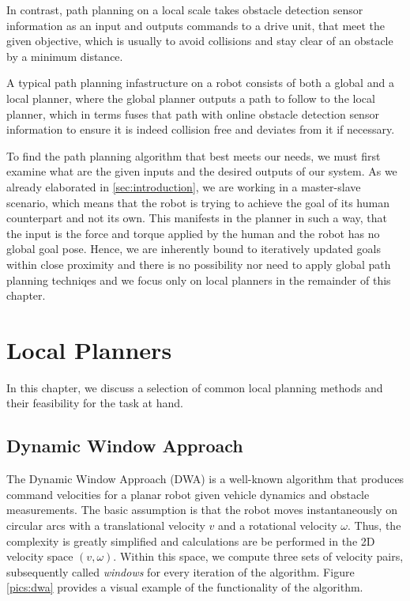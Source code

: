 In contrast, path planning on a local scale takes obstacle detection sensor information as an input and outputs commands to a drive unit, that meet the given objective, which is usually to avoid collisions and stay clear of an obstacle by a minimum distance. 

A typical path planning infastructure on a robot consists of both a global and a local planner, where the global planner outputs a path to follow to the local planner, which in terms fuses that path with online obstacle detection sensor information to ensure it is indeed collision free and deviates from it if necessary.

To find the path planning algorithm that best meets our needs, we must first examine what are the given inputs and the desired outputs of our system. As we already elaborated in \cref{sec:introduction}, we are working in a master-slave scenario, which means that the robot is trying to achieve the goal of its human counterpart and not its own. This manifests in the planner in such a way, that the input is the force and torque applied by the human and the robot has no global goal pose. Hence, we are inherently bound to iteratively updated goals within close proximity and there is no possibility nor need to apply global path planning techniqes and we focus only on local planners in the remainder of this chapter.

\section{Local Planners}
In this chapter, we discuss a selection of common local planning methods and their feasibility for the task at hand.


\subsection{Dynamic Window Approach}
The Dynamic Window Approach (DWA) \citep{fox1997dynamic} is a well-known algorithm that produces command velocities for a planar robot given vehicle dynamics and obstacle measurements. The basic assumption is that the robot moves instantaneously on circular arcs with a translational velocity $v$ and a rotational velocity $\omega$. Thus, the complexity is greatly simplified and calculations are be performed in the 2D velocity space $(v,\omega)$. Within this space, we compute three sets of velocity pairs,  subsequently called \emph{windows} for every iteration of the algorithm. Figure \ref{pics:dwa} provides a visual example of the functionality of the algorithm.

